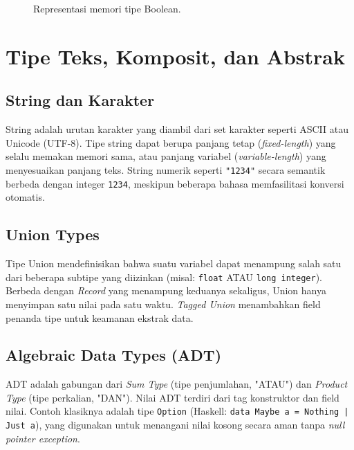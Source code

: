 \documentclass[11pt,a4paper]{article}
\begin{document}
	\begin{figure}[H]
		\centering
		\caption{Representasi memori tipe Boolean.}
		\label{fig:boolean}
	\end{figure}
	
	\section{Tipe Teks, Komposit, dan Abstrak}
	
	\subsection{String dan Karakter}
	String adalah urutan karakter yang diambil dari set karakter seperti ASCII atau Unicode (UTF-8). Tipe string dapat berupa panjang tetap (\textit{fixed-length}) yang selalu memakan memori sama, atau panjang variabel (\textit{variable-length}) yang menyesuaikan panjang teks. String numerik seperti \texttt{"1234"} secara semantik berbeda dengan integer \texttt{1234}, meskipun beberapa bahasa memfasilitasi konversi otomatis.
	
	\subsection{Union Types}
	Tipe Union mendefinisikan bahwa suatu variabel dapat menampung salah satu dari beberapa subtipe yang diizinkan (misal: \texttt{float} ATAU \texttt{long integer}). Berbeda dengan \textit{Record} yang menampung keduanya sekaligus, Union hanya menyimpan satu nilai pada satu waktu. \textit{Tagged Union} menambahkan field penanda tipe untuk keamanan ekstrak data.
	
	\subsection{Algebraic Data Types (ADT)}
	ADT adalah gabungan dari \textit{Sum Type} (tipe penjumlahan, "ATAU") dan \textit{Product Type} (tipe perkalian, "DAN"). Nilai ADT terdiri dari tag konstruktor dan field nilai. Contoh klasiknya adalah tipe \texttt{Option} (Haskell: \texttt{data Maybe a = Nothing | Just a}), yang digunakan untuk menangani nilai kosong secara aman tanpa \textit{null pointer exception}.
	
\end{document}
